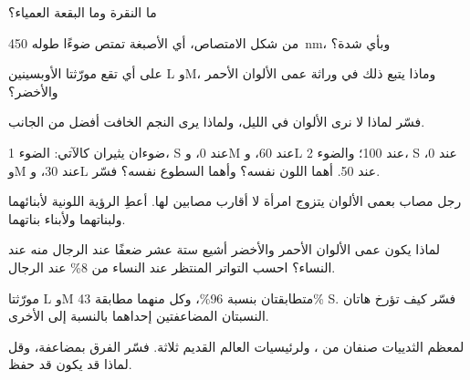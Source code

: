 \begin{exercise}[$\star$]\label{exo:g11:the-eye:3}
ما النقرة وما البقعة العمياء؟
\end{exercise}

\begin{exercise}[$\star$]\label{exo:g11:the-eye:4}
من شكل الامتصاص، أي الأصبغة تمتص ضوءًا طوله \qty{450}{nm}، وبأي شدة؟
\end{exercise}

\begin{exercise}[$\star$]\label{exo:g11:the-eye:5}
على أي  تقع مورّثتا الأوبسينين L وM، وماذا يتبع ذلك في وراثة عمى
الألوان الأحمر والأخضر؟
\end{exercise}

\begin{exercise}[$\star\star$]\label{exo:g11:the-eye:6}
فسّر لماذا لا نرى الألوان في الليل، ولماذا يرى النجم الخافت أفضل من
الجانب.
\end{exercise}

\begin{exercise}[$\star\star$]\label{exo:g11:the-eye:7}
ضوءان يثيران  كالآتي: الضوء 1، S عند 0، وM عند 60، وL عند 100؛
والضوء 2، S عند 0، وM عند 30، وL عند 50. أهما اللون نفسه؟ وأهما
السطوع نفسه؟ فسّر.
\end{exercise}

\begin{exercise}[$\star\star$]\label{exo:g11:the-eye:8}
رجل مصاب بعمى الألوان يتزوج امرأة لا أقارب مصابين لها. أعطِ الرؤية
اللونية لأبنائهما ولبناتهما ولأبناء بناتهما.
\end{exercise}

\begin{exercise}[$\star\star$]\label{exo:g11:the-eye:9}
لماذا يكون عمى الألوان الأحمر والأخضر أشيع ستة عشر ضعفًا عند الرجال منه
عند النساء؟ احسب التواتر المنتظر عند النساء من 8\% عند الرجال.
\end{exercise}

\begin{exercise}[$\star\star$]\label{exo:g11:the-eye:10}
مورّثتا L وM متطابقتان بنسبة 96\%، وكل منهما مطابقة 43\%  S.
فسّر كيف تؤرخ هاتان النسبتان المضاعفتين إحداهما بالنسبة إلى الأخرى.
\end{exercise}

\begin{exercise}[$\star\star$]\label{exo:g11:the-eye:11}
لمعظم الثدييات صنفان من ، ولرئيسيات العالم القديم ثلاثة. فسّر
الفرق بمضاعفة، وقل لماذا قد يكون قد حفظ.
\end{exercise}

